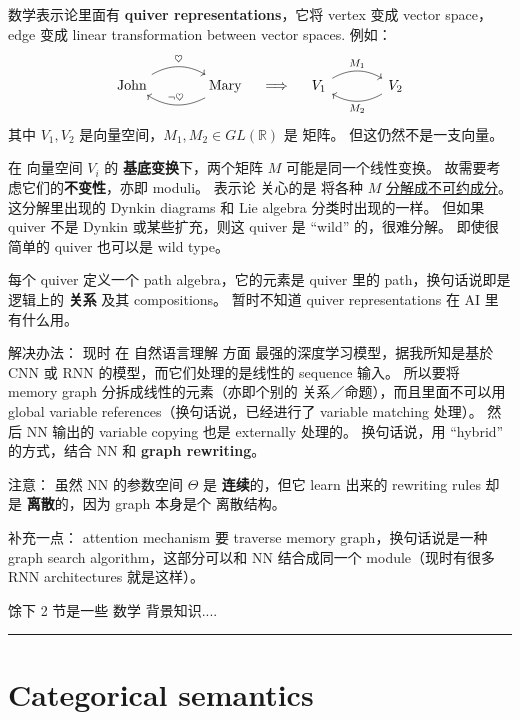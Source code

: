 \documentclass[12pt, orivec]{article}
\begin{document}
\begin{tcolorbox}[breakable, parbox=false]
数学表示论里面有 \textbf{quiver representations}，它将 vertex 变成 vector space，edge 变成 linear transformation between vector spaces. 例如：
\begin{equation}
\begin{tikzcd}[column sep = large]
\mbox{John} \arrow[r, bend left, "\heartsuit"] & \arrow[l, bend left, swap, "\neg \heartsuit"] \mbox{Mary}
\end{tikzcd}
\quad \Longrightarrow \quad
\begin{tikzcd}[column sep = large]
V_1 \arrow[r, bend left, "M_1"] & \arrow[l, bend left, "M_2"] V_2
\end{tikzcd}
\end{equation}
其中 $V_1, V_2$ 是向量空间，$M_1, M_2 \in GL(\mathbb{R})$ 是 矩阵。  但这仍然不是一支向量。  

在 向量空间 $V_i$ 的 \textbf{基底变换}下，两个矩阵 $M$ 可能是同一个线性变换。  故需要考虑它们的\textbf{不变性}，亦即 moduli。 表示论 关心的是 将各种 $M$ \uline{分解成不可约成分}。 这分解里出现的 Dynkin diagrams 和 Lie algebra 分类时出现的一样。  但如果 quiver 不是 Dynkin 或某些扩充，则这 quiver 是 ``wild'' 的，很难分解。 即使很简单的 quiver 也可以是 wild type。

每个 quiver 定义一个 path algebra，它的元素是 quiver 里的 path，换句话说即是逻辑上的 \textbf{关系} 及其 compositions。 暂时不知道 quiver representations 在 AI 里有什么用。
\end{tcolorbox}

解决办法： 现时 在 自然语言理解 方面 最强的深度学习模型，据我所知是基於 CNN 或 RNN 的模型，而它们处理的是线性的 sequence 输入。 所以要将 memory graph 分拆成线性的元素（亦即个别的 关系／命题），而且里面不可以用 global variable references（换句话说，已经进行了 variable matching 处理）。  然后 NN 输出的 variable copying 也是 externally 处理的。 换句话说，用 ``hybrid'' 的方式，结合 NN 和 \textbf{graph rewriting}。

注意： 虽然 NN 的参数空间 $\Theta$ 是 \textbf{连续}的，但它 learn 出来的 rewriting rules 却是 \textbf{离散}的，因为 graph 本身是个 离散结构。 

补充一点： attention mechanism 要 traverse memory graph，换句话说是一种 graph search algorithm，这部分可以和 NN 结合成同一个 module（现时有很多 RNN architectures 就是这样）。

馀下 2 节是一些 数学 背景知识....
\hrule

\section{Categorical semantics}
\label{Categorical-semantics}
\end{document}
